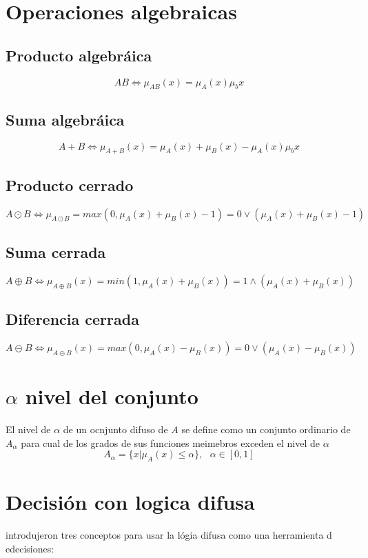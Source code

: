 \documentclass{article}
\begin{document}
\section{Operaciones algebraicas}
\subsection{Producto algebráica}
$$AB \Leftrightarrow \mu_{AB}(x)= \mu_A(x)\mu_b{x}$$
\subsection{Suma algebráica}
$$A+B \Leftrightarrow \mu_{A+B}(x)= \mu_A (x)+\mu_B(x)-\mu_A(x)\mu_b{x}$$
\subsection{Producto cerrado}
$$A \odot B \Leftrightarrow \mu_{A \odot B } = max(0,\mu_A(x)+\mu_B(x)-1)=0 \lor (\mu_A (x)+\mu_B(x)-1)$$
\subsection{Suma cerrada}
$$A\oplus B \Leftrightarrow \mu_{A \oplus B}(x)=min(1,\mu_A(x)+\mu_B(x))= 1 \land (\mu_A(x)+\mu_B(x))$$
\subsection{Diferencia cerrada}
$$A \circleddash B \Leftrightarrow \mu_{A \circleddash B }(x)=max (0,\mu_A (x)-\mu_B(x))=0\lor (\mu_A (x)-\mu_B(x)) $$ 
\section{$\alpha$ nivel del conjunto}
El nivel de $\alpha$ de un ocnjunto difuso de $A$ se define como un conjunto ordinario de $A_\alpha$ para cual de los grados de sus funciones meimebros exceden el nivel de $\alpha$
$$A_\alpha=\{x| \mu_A (x) \leq \alpha \}, \text{  } \alpha \in [0,1]$$
\section{Decisión con logica difusa}
\citep{3295591b-c3f1-3d45-b93b-b5949fd53fec} introdujeron tres conceptos para usar la lógia difusa como una herramienta d edecisiones:
\end{document}
